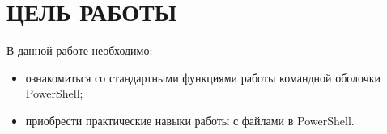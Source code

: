 \section{ЦЕЛЬ РАБОТЫ}

В данной работе необходимо:

\begin{itemize}
  \item ознакомиться со стандартными функциями работы командной оболочки PowerShell;
  \item приобрести практические навыки работы с файлами в PowerShell.
\end{itemize}

\newpage
